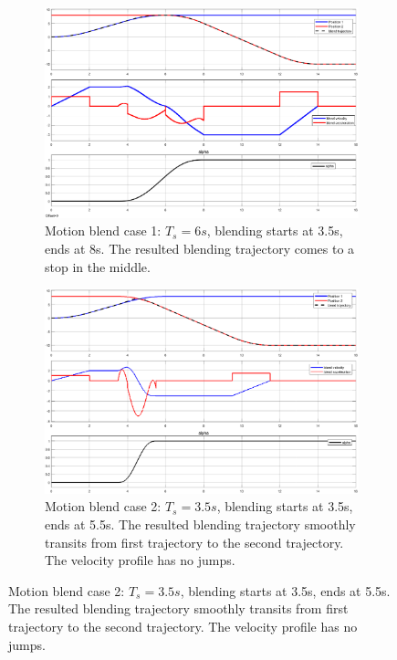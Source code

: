 \documentclass{article}
\begin{document}
\begin{figure}[ht]
	\vspace*{-5mm}
	\centering
	\begin{subfigure}[ht]{0.8\textwidth}%
		\centering
		\includegraphics[width=0.8\columnwidth]{figure/blend_case_1.eps}%
		\caption{Motion blend case 1: $T_s = 6s$, blending starts at 3.5s, ends at 8s. The resulted blending trajectory comes to a stop in the middle.}%
		\label{blend_case_1}%
	\end{subfigure}
	
	\begin{subfigure}[ht]{0.8\textwidth}%
		\centering
		\includegraphics[width=0.8\columnwidth]{figure/blend_case_2.eps}%
		\caption{Motion blend case 2: $T_s = 3.5s$, blending starts at 3.5s, ends at 5.5s. The resulted blending trajectory smoothly transits from first trajectory to the second trajectory. The velocity profile has no jumps.}%
		\label{blend_case_2}%
	\end{subfigure}
	

\end{figure}
\end{document}
